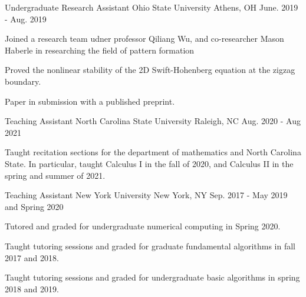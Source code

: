 \begin{cventries}
  \cventry
    {Undergraduate Research Assistant} %
    {Ohio State University} %
    {Athens, OH} %
    {June. 2019 - Aug. 2019} %
    {
      \begin{cvitems} %
        \item {Joined a research team udner professor Qiliang Wu, and co-researcher Mason Haberle in researching the field of pattern formation}
        \item {Proved the nonlinear stability of the 2D Swift-Hohenberg equation at the zigzag boundary.}
        \item {Paper in submission with a published preprint.}
      \end{cvitems}
    }

\end{cventries}

\begin{cventries}

  \cventry
    {Teaching Assistant} %
    {North Carolina State University} %
    {Raleigh, NC} %
    {Aug. 2020 - Aug 2021} %
    {
      \begin{cvitems} %
        \item {Taught recitation sections for the department of mathematics and North Carolina State. In particular, taught Calculus I in the fall of 2020, and Calculus II in the spring and summer of 2021.}
      \end{cvitems}
    }

  \cventry
    {Teaching Assistant} %
    {New York University} %
    {New York, NY} %
    {Sep. 2017 - May 2019 and Spring 2020} %
    {
      \begin{cvitems} %
        \item {Tutored and graded for undergraduate numerical computing in Spring 2020.}
        \item {Taught tutoring sessions and graded for graduate fundamental algorithms in
          fall 2017 and 2018.}
        \item {Taught tutoring sessions and graded for undergraduate basic algorithms in
          spring 2018 and 2019.}
      \end{cvitems}
    }

\end{cventries}

